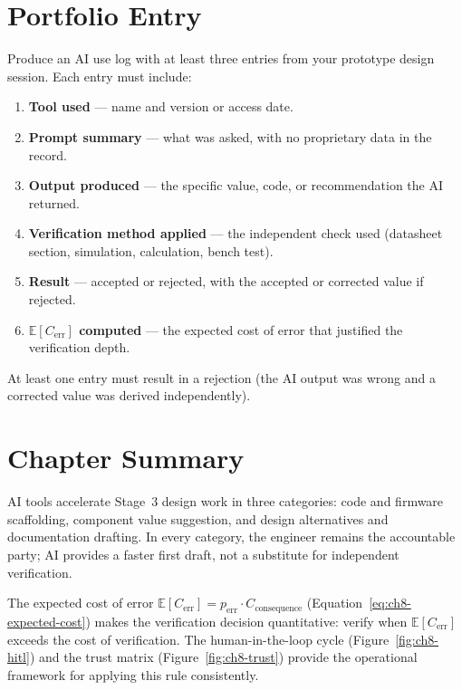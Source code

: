 \section*{Portfolio Entry}
\label{sec:ch8-artifact}

Produce an AI use log with at least three entries from your prototype design
session.
Each entry must include:
\begin{enumerate}
  \item \textbf{Tool used} --- name and version or access date.
  \item \textbf{Prompt summary} --- what was asked, with no proprietary data
        in the record.
  \item \textbf{Output produced} --- the specific value, code, or recommendation
        the AI returned.
  \item \textbf{Verification method applied} --- the independent check used
        (datasheet section, simulation, calculation, bench test).
  \item \textbf{Result} --- accepted or rejected, with the accepted or
        corrected value if rejected.
  \item \textbf{$\mathbb{E}[C_{\text{err}}]$ computed} --- the expected cost
        of error that justified the verification depth.
\end{enumerate}

At least one entry must result in a rejection (the AI output was wrong and a
corrected value was derived independently).

\section*{Chapter Summary}
\label{sec:ch8-summary}

AI tools accelerate Stage~3 design work in three categories: code and firmware
scaffolding, component value suggestion, and design alternatives and
documentation drafting.
In every category, the engineer remains the accountable party; AI provides a
faster first draft, not a substitute for independent verification.

The expected cost of error $\mathbb{E}[C_{\text{err}}] = p_{\text{err}} \cdot
C_{\text{consequence}}$ (Equation~\ref{eq:ch8-expected-cost}) makes the
verification decision quantitative: verify when $\mathbb{E}[C_{\text{err}}]$
exceeds the cost of verification.
The human-in-the-loop cycle (Figure~\ref{fig:ch8-hitl}) and the trust matrix
(Figure~\ref{fig:ch8-trust}) provide the operational framework for applying
this rule consistently.

